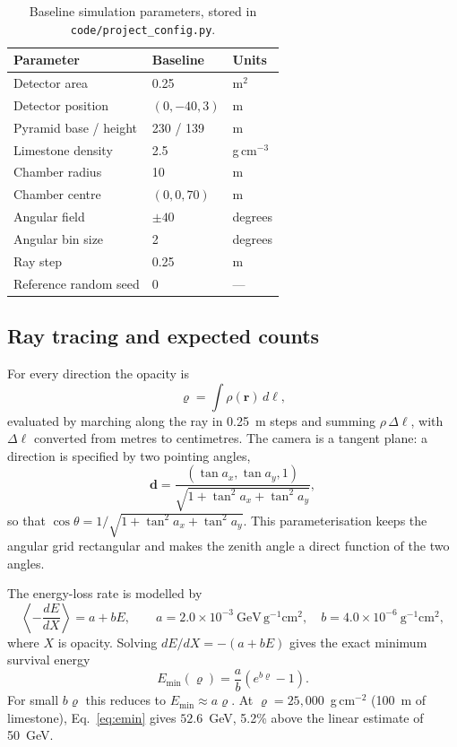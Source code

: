 \documentclass{article}
\begin{document}
\begin{table}[t]
\centering
\caption{Baseline simulation parameters, stored in
\texttt{code/project\_config.py}.}
\label{tab:params}
\small
\begin{tabular}{@{}lll@{}}
\toprule
Parameter & Baseline & Units \\
\midrule
Detector area & 0.25 & m$^2$ \\
Detector position & $(0,-40,3)$ & m \\
Pyramid base / height & 230 / 139 & m \\
Limestone density & 2.5 & g\,cm$^{-3}$ \\
Chamber radius & 10 & m \\
Chamber centre & $(0,0,70)$ & m \\
Angular field & $\pm40$ & degrees \\
Angular bin size & 2 & degrees \\
Ray step & 0.25 & m \\
Reference random seed & 0 & --- \\
\bottomrule
\end{tabular}
\end{table}


\subsection{Ray tracing and expected counts}

For every direction the opacity is
\begin{equation}
\varrho=\int \rho(\mathbf{r})\,d\ell,
\label{eq:opacity}
\end{equation}
evaluated by marching along the ray in 0.25~m steps and summing
$\rho\,\Delta\ell$, with $\Delta\ell$ converted from metres to centimetres. The
camera is a tangent plane: a direction is specified by two pointing angles,
\begin{equation}
\mathbf{d}=\frac{(\tan a_x,\tan a_y,1)}
{\sqrt{1+\tan^2a_x+\tan^2a_y}},
\label{eq:direction}
\end{equation}
so that $\cos\theta=1/\sqrt{1+\tan^2a_x+\tan^2a_y}$. This parameterisation
keeps the angular grid rectangular and makes the zenith angle a direct
function of the two angles.

The energy-loss rate is modelled by
\begin{equation}
\left\langle-\frac{dE}{dX}\right\rangle=a+bE,
\qquad
a=2.0\times10^{-3}~\mathrm{GeV\,g^{-1}cm^2},\quad
b=4.0\times10^{-6}~\mathrm{g^{-1}cm^2},
\label{eq:loss}
\end{equation}
where $X$ is opacity. Solving $dE/dX=-(a+bE)$ gives the exact minimum
survival energy
\begin{equation}
E_{\min}(\varrho)=\frac{a}{b}\left(e^{b\varrho}-1\right).
\label{eq:emin}
\end{equation}
For small $b\varrho$ this reduces to $E_{\min}\approx a\varrho$. At
$\varrho=25{,}000$~g\,cm$^{-2}$ (100~m of limestone), Eq.~\eqref{eq:emin}
gives $52.6$~GeV, 5.2\% above the linear estimate of 50~GeV.
\end{document}
